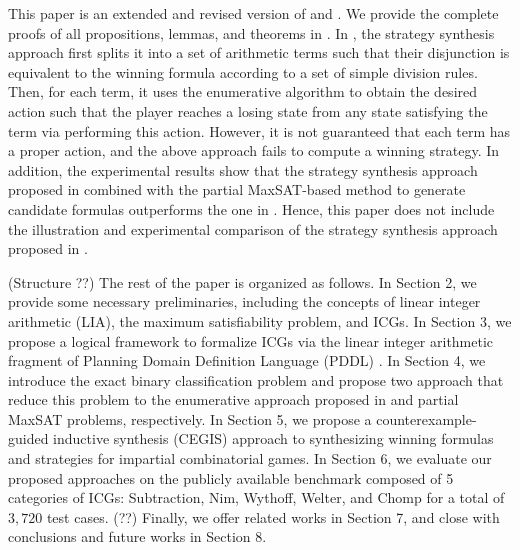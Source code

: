 \documentclass[review]{elsarticle}
\begin{document}
This paper is an extended and revised version of \cite{WuFXLQCR2020} and \cite{FanYD2024}.
We provide the complete proofs of all propositions, lemmas, and theorems in \cite{FanYD2024}. %
In \cite{WuFXLQCR2020}, the strategy synthesis approach first splits it into a set of arithmetic terms such that their disjunction is equivalent to the winning formula according to a set of simple division rules.
Then, for each term, it uses the enumerative algorithm to obtain the desired action such that the player reaches a losing state from any state satisfying the term via performing this action.
However, it is not guaranteed that each term has a proper action, and the above approach fails to compute a winning strategy.
In addition, the experimental results show that the strategy synthesis approach proposed in \cite{FanYD2024} combined with the partial MaxSAT-based method to generate candidate formulas outperforms the one in \cite{WuFXLQCR2020}.
Hence, this paper does not include the illustration and experimental comparison of the strategy synthesis approach proposed in \cite{WuFXLQCR2020}.


	(Structure ??)
	The rest of the paper is organized as follows. 
	In Section 2, we provide some necessary preliminaries, including the concepts of linear integer arithmetic (LIA), the maximum satisfiability problem, and ICGs.
	In Section 3, we propose a logical framework to formalize ICGs via the linear integer arithmetic fragment of Planning Domain Definition Language (PDDL) \cite{FoxL2003}.
	In Section 4, we introduce the exact binary classification problem and propose two approach that reduce this problem to the enumerative approach proposed in \cite{UduRDMMA2013} and partial MaxSAT problems, respectively.
	In Section 5, we propose a counterexample-guided inductive synthesis (CEGIS) approach to synthesizing winning formulas and strategies for impartial combinatorial games.
	In Section 6, we evaluate our proposed approaches on the publicly available benchmark composed of 5 categories of ICGs: Subtraction, Nim, Wythoff, Welter, and Chomp for a total of $3,720$ test cases. (??) Finally, we offer related works in Section 7, and close with conclusions and future works in Section 8.
\end{document}
